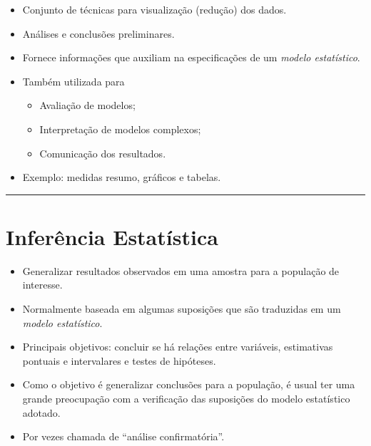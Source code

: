 \documentclass[
]{book}
\providecommand{\tightlist}{%
  \setlength{\itemsep}{0pt}\setlength{\parskip}{0pt}}
\begin{document}
\begin{itemize}
\tightlist
\item
  Conjunto de técnicas para visualização (redução) dos dados.\\
\item
  Análises e conclusões preliminares.\\
\item
  Fornece informações que auxiliam na especificações de um \emph{modelo estatístico}.\\
\item
  Também utilizada para

  \begin{itemize}
  \tightlist
  \item
    Avaliação de modelos;\\
  \item
    Interpretação de modelos complexos;\\
  \item
    Comunicação dos resultados.
  \end{itemize}
\item
  Exemplo: medidas resumo, gráficos e tabelas.
\end{itemize}

\begin{center}\rule{0.5\linewidth}{0.5pt}\end{center}

\section{Inferência Estatística}\label{inferuxeancia-estatuxedstica}

\begin{itemize}
\tightlist
\item
  Generalizar resultados observados em uma amostra para a população de interesse.\\
\item
  Normalmente baseada em algumas suposições que são traduzidas em um \emph{modelo estatístico}.\\
\item
  Principais objetivos: concluir se há relações entre variáveis, estimativas pontuais e intervalares e testes de hipóteses.\\
\item
  Como o objetivo é generalizar conclusões para a população, é usual ter uma grande preocupação com a verificação das suposições do modelo estatístico adotado.\\
\item
  Por vezes chamada de ``análise confirmatória''.
\end{itemize}
\end{document}
